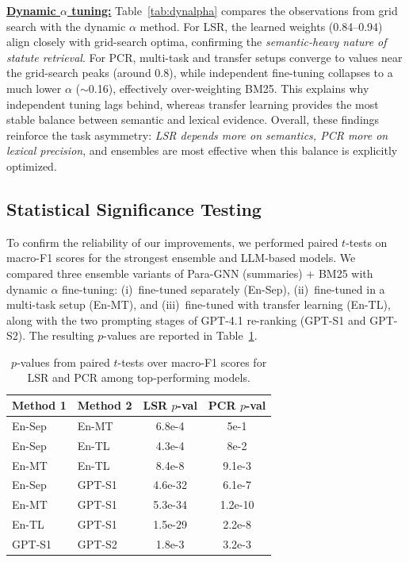\vspace{1mm}
\noindent \underline{\bf Dynamic $\alpha$ tuning:} Table~\ref{tab:dynalpha} compares the observations from grid search with the dynamic $\alpha$ method. For LSR, the learned weights (0.84–0.94) align closely with grid-search optima, confirming the \textit{semantic-heavy nature of statute retrieval}. For PCR, multi-task and transfer setups converge to values near the grid-search peaks (around 0.8), while independent fine-tuning collapses to a much lower $\alpha$ ($\sim$0.16), effectively over-weighting BM25. This explains why independent tuning lags behind, whereas transfer learning provides the most stable balance between semantic and lexical evidence. Overall, these findings reinforce the task asymmetry: \textit{LSR depends more on semantics, PCR more on lexical precision}, and ensembles are most effective when this balance is explicitly optimized.


\subsection{Statistical Significance Testing} \label{app:sigtest}
To confirm the reliability of our improvements, we performed paired $t$-tests on macro-F1 scores for the strongest ensemble and LLM-based models. We compared three ensemble variants of Para-GNN (summaries) + BM25 with dynamic $\alpha$ fine-tuning: (i)~fine-tuned separately (En-Sep), (ii)~fine-tuned in a multi-task setup (En-MT), and (iii)~fine-tuned with transfer learning (En-TL), along with the two prompting stages of GPT-4.1 re-ranking (GPT-S1 and GPT-S2). The resulting $p$-values are reported in Table~\ref{tab:sigtest}.

\begin{table}[!ht]
    \centering
    \small
    \begin{tabular}{llcc}
        \toprule
         \textbf{Method 1} & \textbf{Method 2} & \textbf{LSR $p$-val} & \textbf{PCR $p$-val} \\ 
         \midrule
         En-Sep & En-MT  & 6.8e-4  & 5e-1 \\
         En-Sep & En-TL  & 4.3e-4  & 8e-2 \\
         En-MT  & En-TL  & 8.4e-8  & 9.1e-3 \\
         En-Sep & GPT-S1 & 4.6e-32 & 6.1e-7 \\
         En-MT  & GPT-S1 & 5.3e-34 & 1.2e-10 \\
         En-TL  & GPT-S1 & 1.5e-29 & 2.2e-8 \\
         GPT-S1 & GPT-S2 & 1.8e-3  & 3.2e-3 \\
         \bottomrule
    \end{tabular}
    \caption{$p$-values from paired $t$-tests over macro-F1 scores for LSR and PCR among top-performing models.}
    \label{tab:sigtest}
\end{table}

